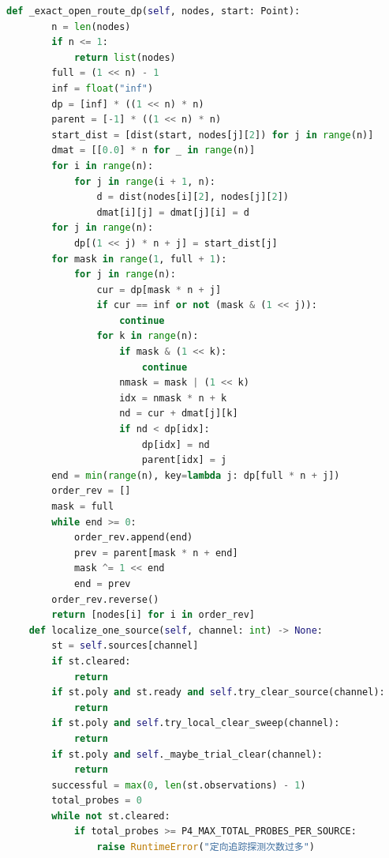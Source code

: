 \documentclass[withoutpreface,bwprint]{cumcmthesis} %
\begin{document}
\begin{appendices}
\begin{lstlisting}[language=python]
    def _exact_open_route_dp(self, nodes, start: Point):
        n = len(nodes)
        if n <= 1:
            return list(nodes)
        full = (1 << n) - 1
        inf = float("inf")
        dp = [inf] * ((1 << n) * n)
        parent = [-1] * ((1 << n) * n)
        start_dist = [dist(start, nodes[j][2]) for j in range(n)]
        dmat = [[0.0] * n for _ in range(n)]
        for i in range(n):
            for j in range(i + 1, n):
                d = dist(nodes[i][2], nodes[j][2])
                dmat[i][j] = dmat[j][i] = d
        for j in range(n):
            dp[(1 << j) * n + j] = start_dist[j]
        for mask in range(1, full + 1):
            for j in range(n):
                cur = dp[mask * n + j]
                if cur == inf or not (mask & (1 << j)):
                    continue
                for k in range(n):
                    if mask & (1 << k):
                        continue
                    nmask = mask | (1 << k)
                    idx = nmask * n + k
                    nd = cur + dmat[j][k]
                    if nd < dp[idx]:
                        dp[idx] = nd
                        parent[idx] = j
        end = min(range(n), key=lambda j: dp[full * n + j])
        order_rev = []
        mask = full
        while end >= 0:
            order_rev.append(end)
            prev = parent[mask * n + end]
            mask ^= 1 << end
            end = prev
        order_rev.reverse()
        return [nodes[i] for i in order_rev]
    def localize_one_source(self, channel: int) -> None:
        st = self.sources[channel]
        if st.cleared:
            return
        if st.poly and st.ready and self.try_clear_source(channel):
            return
        if st.poly and self.try_local_clear_sweep(channel):
            return
        if st.poly and self._maybe_trial_clear(channel):
            return
        successful = max(0, len(st.observations) - 1)
        total_probes = 0
        while not st.cleared:
            if total_probes >= P4_MAX_TOTAL_PROBES_PER_SOURCE:
                raise RuntimeError("定向追踪探测次数过多")


\end{lstlisting}
\end{appendices}
\end{document}
